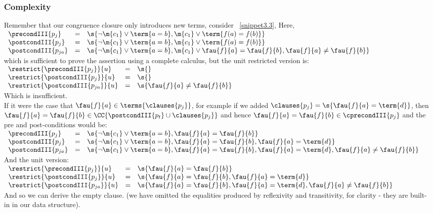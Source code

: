 \subsubsection{Complexity}
Remember that our congruence closure only introduces new terms, consider ~\ref{snippet3.3},
\noindent
Here, \\ 
$
\begin{array}{lll}
	\precondIII{p_j}     & = & \s{\lnot \m{c_1} \lor \term{a=b}, \m{c_1} \lor \term{f(a)=f(b)}} \\
	\postcondIII{p_j}    & = & \s{\lnot \m{c_1} \lor \term{a=b}, \m{c_1} \lor \term{f(a)=f(b)}} \\
	\postcondIII{p_{ja}} & = & \s{\lnot \m{c_1} \lor \term{a=b}, \m{c_1} \lor \fau{f}{a}=\fau{f}{b},\fau{f}{a} \neq \fau{f}{b}}
\end{array}
$\\
which is sufficient to prove the assertion using a complete calculus, but the unit restricted version is:\\
$
\begin{array}{lll}
	\restrict{\precondIII{p_j}}{u}     & = & \s{} \\
	\restrict{\postcondIII{p_j}}{u}    & = & \s{} \\
	\restrict{\postcondIII{p_{ja}}}{u} & = & \s{\fau{f}{a} \neq \fau{f}{b}}
\end{array}
$\\
Which is insufficient.\\
If it were the case that $\fau{f}{a} \in \terms{\clauses{p_j}}$, for example if we added $\clauses{p_j} = \s{\fau{f}{a}=\term{d}}$, 
then $\fau{f}{a}=\fau{f}{b} \in \CC{\postcondIII{p_t} \cup \clauses{p_j}}$ and hence
$\fau{f}{a}=\fau{f}{b} \in \cprecondIII{p_j}$ and the pre and post-conditions would be:\\
$
\begin{array}{lll}
\precondIII{p_j}     & = & \s{\lnot \m{c_1} \lor \term{a=b}, \fau{f}{a}=\fau{f}{b}} \\
\postcondIII{p_j}    & = & \s{\lnot \m{c_1} \lor \term{a=b}, \fau{f}{a}=\fau{f}{b},\fau{f}{a}=\term{d}} \\
\postcondIII{p_{ja}} & = & \s{\lnot \m{c_1} \lor \term{a=b}, \fau{f}{a}=\fau{f}{b},\fau{f}{a}=\term{d},\fau{f}{a} \neq \fau{f}{b}}
\end{array}
$\\
And the unit version:\\
$
\begin{array}{lll}
\restrict{\precondIII{p_j}}{u}     & = & \s{\fau{f}{a}=\fau{f}{b}} \\
\restrict{\postcondIII{p_j}}{u}    & = & \s{\fau{f}{a}=\fau{f}{b}, \fau{f}{a}=\term{d}} \\
\restrict{\postcondIII{p_{ja}}}{u} & = & \s{\fau{f}{a}=\fau{f}{b}, \fau{f}{a}=\term{d},\fau{f}{a} \neq \fau{f}{b}} \\
\end{array}
$\\
And so we can derive the empty clause.
(we have omitted the equalities produced by reflexivity and transitivity, for clarity - they are built-in in our data structure).

